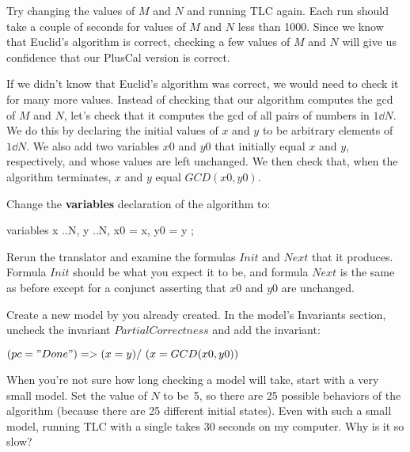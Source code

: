 Try changing the values of $M$ and $N$ and running TLC again.  Each
run should take a couple of seconds for values of $M$ and $N$ less
than 1000.  Since we know that Euclid's algorithm is correct, checking
a few values of $M$ and $N$ will give us confidence that our PlusCal
version is correct.  

If we didn't know that Euclid's algorithm was correct, we would need
to check it for many more values.  Instead of checking that our
algorithm computes the gcd of $M$ and $N$, let's check that it
computes the gcd of all pairs of numbers in $1\dd N$.  We do this by
declaring the initial values of $x$ and $y$ to be arbitrary elements
of $1\dd N$.  We also add two variables $x0$ and $y0$ that initially
equal $x$ and $y$, respectively, and whose values are left unchanged.
We then check that, when the algorithm terminates, $x$ and $y$ equal
$GCD(x0,y0)$.

Change the \textbf{variables} declaration of the algorithm to:
\begin{display}
\begin{nopcal}
variables x ..N, y ..N, x0 = x, y0 = y ;
\end{nopcal}
\begin{tlatex}
\end{tlatex}
\end{display}
Rerun the translator and examine the formulas $Init$ and $Next$ that
it produces.  Formula $Init$ should be what you expect it to be, and
formula $Next$ is the same as before except for a conjunct asserting
that $x0$ and $y0$ are unchanged.

Create a new model by 
   you already created.
In the model's \textsf{Invariants} section, uncheck the invariant
$PartialCorrectness$ and add the invariant:
\begin{display}
$(pc = "Done") => (x = y) /\ (x = GCD(x0, y0))$
\end{display}
When you're not sure how long checking a model will take, start with a
very small model.  Set the value of $N$ to be~5, so there are 25
possible behaviors of the algorithm (because there are 25 different
initial states).  Even with such a small model, running TLC with a
single  takes 30 seconds on my
computer.  Why is it so slow?

